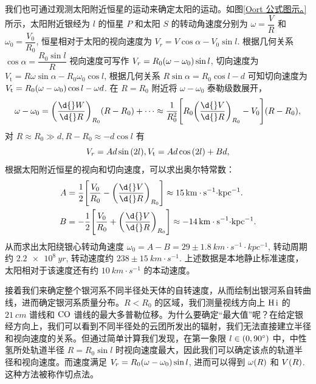 \documentclass[../天体物理基础.tex]{subfiles}
\begin{document}
我们也可通过观测太阳附近恒星的运动来确定太阳的运动。如图\ref{Oort 公式图示。}所示，太阳附近银经为 $l$ 的恒星 $P$ 和太阳 $S$ 的转动角速度分别为 $\omega=\dfrac{V}{R}$ 和 $\omega_{0}=\dfrac{V_{0}}{R_{0}}$, 恒星相对于太阳的视向速度为 $V_{r}=V\cos{\alpha}-V_{0}\sin{l}$. 根据几何关系 $\cos{\alpha}=\dfrac{R_{0}\sin{l}}{R}$ 视向速度可写作 $V_{r}=R_{0}\mleft(\omega-\omega_{0}\mright)\sin{l}$, 切向速度为 $V_{\mathrm{t}}=R\omega\sin{\alpha}-R_{0}\omega_{0}\cos{l}$, 根据几何关系 $R\sin{\alpha}=R_{0}\cos{l}-d$ 可知切向速度为 $V_{\mathrm{t}}=R_{0}\mleft(\omega-\omega_{0}\mright)\cos{l}-\omega d$. 在 $R=R_{0}$ 附近将 $\omega-\omega_{0}$ 泰勒级数展开，
\begin{equation}
\omega-\omega_{0}=\mleft(\frac{\d{}W}{\d{}R}\mright)_{R_{0}}\mleft(R-R_{0}\mright)+\cdots\approx\frac{1}{R_{0}^{2}}\mleft[R_{0}\mleft(\frac{\d{}V}{\d{}R}\mright)_{R_{0}}-V_{0}\mright]\mleft(R-R_{0}\mright),
\end{equation}
对 $R\approx R_{0}\gg d, R-R_{0}\approx-d\cos{l}$ 有
\begin{equation}
V_{r}=Ad\sin{\mleft(2l\mright)}, V_{\mathrm{t}}=Ad\cos{\mleft(2l\mright)}+Bd,
\end{equation}
根据太阳附近恒星的视向和切向速度，可以求出奥尔特常数：
\begin{align}
A&=\frac{1}{2}\mleft[\frac{V_{0}}{R_{0}}-\mleft(\frac{\d{}V}{\d{}R}\mright)_{R_{0}}\mright]\approx\qty{15}{km\cdot{}s^{-1}\cdot kpc^{-1}}.\notag\\
B&=-\frac{1}{2}\mleft[\frac{V_{0}}{R_{0}}+\mleft(\frac{\d{}V}{\d{}R}\mright)_{R_{0}}\mright]\approx\qty{-14}{km\cdot{}s^{-1}\cdot{kpc^{-1}}}.
\end{align}
从而求出太阳绕银心转动角速度 $\omega_{0}=A-B=29\pm\qty{1.8}{km\cdot{}s^{-1}\cdot kpc^{-1}}$, 转动周期约 $\qty{2.2e8}{yr}$, 转动速度约 $238\pm\qty{15}{km\cdot{}s^{-1}}$. 上述数据是本地静止标准速度，太阳相对于该速度还有约 $\qty{10}{km\cdot{}s^{-1}}$ 的本动速度。

接着我们来确定整个银河系不同半径处天体的自转速度，从而绘制出银河系自转曲线，进而确定银河系质量分布。$R<R_{0}$ 的区域，我们测量视线方向上 $\ce{H}\,\mathrm{\uppercase\expandafter{\romannumeral1}}$ 的 $\qty{21}{cm}$ 谱线和 $\ce{CO}$ 谱线的最大多普勒位移。为什么要确定“最大值”呢？在给定银经方向上，我们可以看到不同半径处的云团所发出的辐射，我们无法直接建立半径和视向速度的关系。但通过简单计算我们发现，在第一象限 $l\in\mleft(0, \ang{90;;}\mright)$ 中，中性氢所处轨道半径 $R=R_{0}\sin{l}$ 时视向速度最大，因此我们可以确定该点的轨道半径和视向速度。而速度满足 $V_{r}=R_{0}\mleft(\omega-\omega_{0}\mright)\sin{l}$, 进而可以得到 $\omega\mleft(R\mright)$ 和 $V\mleft(R\mright)$. 这种方法被称作切点法。
\end{document}
